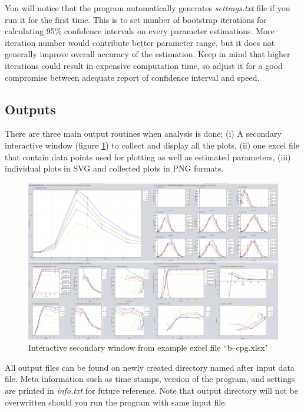 \documentclass{article}
\begin{document}
You will notice that the program automatically generates \textit{settings.txt} file if you run it for the first time. This is to set number of bootstrap iterations for calculating 95\% confidence intervals on every parameter estimations. More iteration number would contribute better parameter range, but it does not generally improve overall accuracy of the estimation. Keep in mind that higher iterations could result in expensive computation time, so adjust it for a good compromise between adequate report of confidence interval and speed.

\subsection{Outputs}
There are three main output routines when analysis is done; (i) A secondary interactive window (figure \ref{fig:outputwindow}) to collect and display all the plots, (ii) one excel file that contain data points used for plotting as well as estimated parameters, (iii) individual plots in SVG and collected plots in PNG formats.

\begin{figure}[h]
    \centering
    \includegraphics[scale=0.53]{./img/outputWindow.png}
    \caption{Interactive secondary window from example excel file ``b--cpg.xlsx"}
    \label{fig:outputwindow}
\end{figure}

All output files can be found on newly created directory named after input data file. Meta information such as time stamps, version of the program, and settings are printed in \textit{info.txt} for future reference. Note that output directory will not be overwritten should you run the program with same input file.
\end{document}
